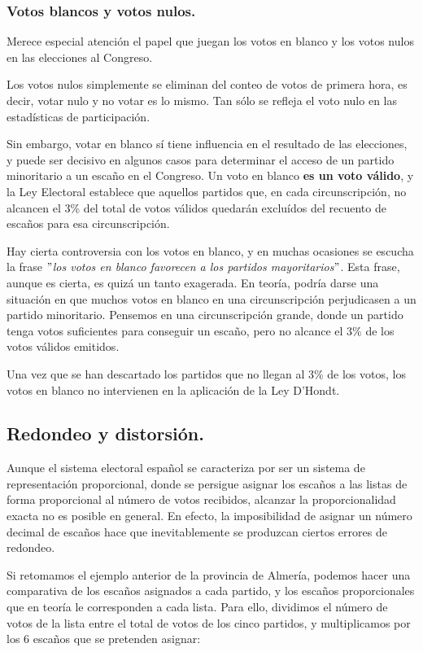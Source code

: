 \documentclass[11pt]{article}
\begin{document}
	
	\subsubsection{Votos blancos y votos nulos.}
	
	Merece especial atención el papel que juegan los votos en blanco y los votos nulos en las elecciones al Congreso.
	
	Los votos nulos simplemente se eliminan del conteo de votos de primera hora, es decir, votar nulo y no votar es lo mismo. Tan sólo se refleja el voto nulo en las estadísticas de participación.
	
	Sin embargo, votar en blanco sí tiene influencia en el resultado de las elecciones, y puede ser decisivo en algunos casos para determinar el acceso de un partido minoritario a un escaño en el Congreso. Un voto en blanco \textbf{es un voto válido}, y la Ley Electoral establece que aquellos partidos que, en cada circunscripción, no alcancen el 3\% del total de votos válidos quedarán excluídos del recuento de escaños para esa circunscripción.
	
	Hay cierta controversia con los votos en blanco, y en muchas ocasiones se escucha la frase $"$\textit{los votos en blanco favorecen a los partidos mayoritarios}$"$. Esta frase, aunque es cierta, es quizá un tanto exagerada. En teoría, podría darse una situación en que muchos votos en blanco en una circunscripción perjudicasen a un partido minoritario. Pensemos en una circunscripción grande, donde un partido tenga votos suficientes para conseguir un escaño, pero no alcance el 3\% de los votos válidos emitidos.
	
	Una vez que se han descartado los partidos que no llegan al 3\% de los votos, los votos en blanco no intervienen en la aplicación de la Ley D'Hondt.
	
	\subsection{Redondeo y distorsión.}
	
	Aunque el sistema electoral español se caracteriza por ser un sistema de representación proporcional, donde se persigue asignar los escaños a las listas de forma proporcional al número de votos recibidos, alcanzar la proporcionalidad exacta no es posible en general. En efecto, la imposibilidad de asignar un número decimal de escaños hace que inevitablemente se produzcan ciertos errores de redondeo.
	
	 Si retomamos el ejemplo anterior de la provincia de Almería, podemos hacer una comparativa de los escaños asignados a cada partido, y los escaños proporcionales que en teoría le corresponden a cada lista. Para ello, dividimos el número de votos de la lista entre el total de votos de los cinco partidos, y multiplicamos por los 6 escaños que se pretenden asignar:
	 
\end{document}
